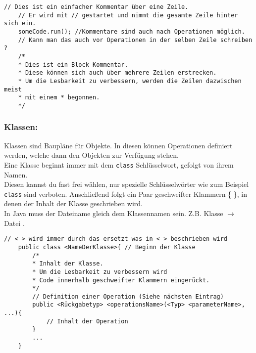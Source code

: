 \begin{lstlisting}[title=\textbf{Kommentar Beispiel}]
	// Dies ist ein einfacher Kommentar über eine Zeile.
	// Er wird mit // gestartet und nimmt die gesamte Zeile hinter sich ein.
	someCode.run(); //Kommentare sind auch nach Operationen möglich.
	// Kann man das auch vor Operationen in der selben Zeile schreiben ?
	/*
	* Dies ist ein Block Kommentar.
	* Diese können sich auch über mehrere Zeilen erstrecken.
	* Um die Lesbarkeit zu verbessern, werden die Zeilen dazwischen meist
	* mit einem * begonnen.
	*/
\end{lstlisting}
\lstset{
	basicstyle=\small
}
\begin{Infobox}

	\subsubsection*{Klassen:}
	Klassen sind Baupläne für Objekte.
	In diesen können Operationen definiert werden, welche dann den Objekten zur Verfügung stehen.\\
	Eine Klasse beginnt immer mit dem \lstinline{class} Schlüsselwort, gefolgt von ihrem Namen.\\
	Diesen kannst du fast frei wählen, nur spezielle Schlüsselwörter wie zum Beispiel \lstinline{class} sind verboten.
	Anschließend folgt ein Paar geschweifter Klammern \{ \}, in denen der Inhalt der Klasse geschrieben wird.\\
	In Java muss der Dateiname gleich dem Klassennamen sein. Z.B. Klasse  $\rightarrow$ Datei .
\end{Infobox}


\begin{lstlisting}[title=\textbf{Klassen Syntax}]
	// < > wird immer durch das ersetzt was in < > beschrieben wird
	public class <NameDerKlasse>{ // Beginn der Klasse
		/*
		* Inhalt der Klasse.
		* Um die Lesbarkeit zu verbessern wird
		* Code innerhalb geschweifter Klammern eingerückt.
		*/
		// Definition einer Operation (Siehe nächsten Eintrag)
		public <Rückgabetyp> <operationsName>(<Typ> <parameterName>, ...){
			// Inhalt der Operation
		}
		...
	}
\end{lstlisting}

